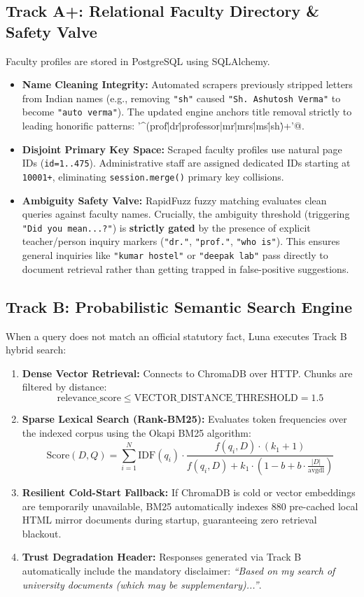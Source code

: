 \documentclass[11pt,a4paper]{article}
\begin{document}
\subsection{Track A+: Relational Faculty Directory \& Safety Valve}
Faculty profiles are stored in PostgreSQL using SQLAlchemy. 
\begin{itemize}
    \item \textbf{Name Cleaning Integrity:} Automated scrapers previously stripped letters from Indian names (e.g., removing \verb|"sh"| caused \verb|"Sh. Ashutosh Verma"| to become \verb|"auto verma"|). The updated engine anchors title removal strictly to leading honorific patterns: \verb@r'^\s*(prof\.|dr\.|professor|mr\.|mrs\.|ms\.|sh\.)\s+'@.
    \item \textbf{Disjoint Primary Key Space:} Scraped faculty profiles use natural page IDs (\texttt{id=1..475}). Administrative staff are assigned dedicated IDs starting at \texttt{10001+}, eliminating \texttt{session.merge()} primary key collisions.
    \item \textbf{Ambiguity Safety Valve:} RapidFuzz fuzzy matching evaluates clean queries against faculty names. Crucially, the ambiguity threshold (triggering \verb|"Did you mean...?"|) is \textbf{strictly gated} by the presence of explicit teacher/person inquiry markers (\verb|"dr."|, \verb|"prof."|, \verb|"who is"|). This ensures general inquiries like \verb|"kumar hostel"| or \verb|"deepak lab"| pass directly to document retrieval rather than getting trapped in false-positive suggestions.
\end{itemize}

\subsection{Track B: Probabilistic Semantic Search Engine}
When a query does not match an official statutory fact, Luna executes Track B hybrid search:
\begin{enumerate}
    \item \textbf{Dense Vector Retrieval:} Connects to ChromaDB over HTTP. Chunks are filtered by distance:
    $$\text{relevance\_score} \le \text{VECTOR\_DISTANCE\_THRESHOLD} = 1.5$$
    \item \textbf{Sparse Lexical Search (Rank-BM25):} Evaluates token frequencies over the indexed corpus using the Okapi BM25 algorithm:
    $$\text{Score}(D, Q) = \sum_{i=1}^N \text{IDF}(q_i) \cdot \frac{f(q_i, D) \cdot (k_1 + 1)}{f(q_i, D) + k_1 \cdot \left(1 - b + b \cdot \frac{|D|}{\text{avgdl}}\right)}$$
    \item \textbf{Resilient Cold-Start Fallback:} If ChromaDB is cold or vector embeddings are temporarily unavailable, BM25 automatically indexes 880 pre-cached local HTML mirror documents during startup, guaranteeing zero retrieval blackout.
    \item \textbf{Trust Degradation Header:} Responses generated via Track B automatically include the mandatory disclaimer: \textit{``Based on my search of university documents (which may be supplementary)...''}.
\end{enumerate}
\end{document}
